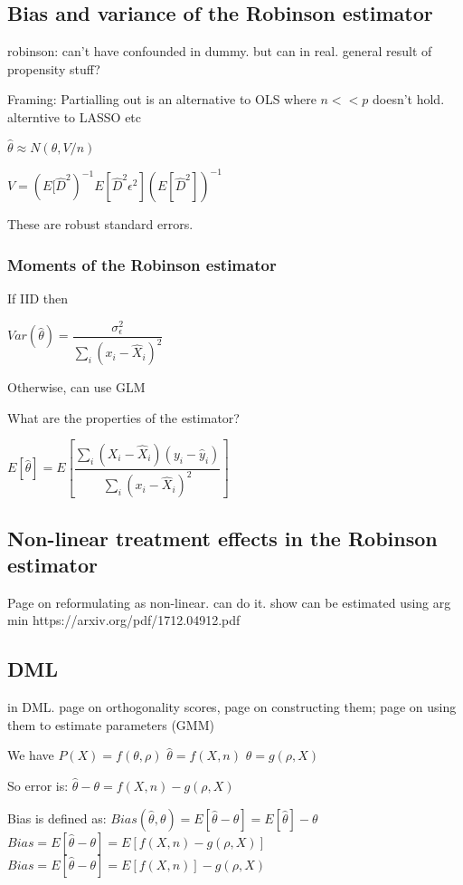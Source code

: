 
\subsection{Bias and variance of the Robinson estimator}

robinson: can't have confounded in dummy. but can in real. general result of propensity stuff?

Framing: Partialling out is an alternative to OLS where \(n<<p\) doesn't hold. alterntive to LASSO etc

\(\hat \theta \approx N(\theta, V/n)\)

\(V=(E[\hat D^2)^{-1}E[\hat D^2\epsilon^2 ](E[\hat D^2])^{-1}\)

These are robust standard errors. 

\subsubsection{Moments of the Robinson estimator}

If IID then

\(Var (\hat \theta) =\dfrac{\sigma^2_\epsilon }{\sum_i(x_i-\hat X_i)^2}\)

Otherwise, can use GLM

What are the properties of the estimator?

\(E[\hat \theta ]=E[\dfrac{\sum_i (X_i-\hat X_i)(y_i-\hat y_i)}{\sum_i(x_i-\hat X_i)^2}]\)


\subsection{Non-linear treatment effects in the Robinson estimator}

Page on reformulating as non-linear. can do it. show can be estimated using arg min
https://arxiv.org/pdf/1712.04912.pdf


\subsection{DML}

in DML. page on orthogonality scores, page on constructing them; page on using them to estimate parameters (GMM)

We have \(P(X)=f(\theta , \rho)\)
\(\hat \theta = f(X, n)\)
\(\theta = g(\rho , X)\)

So error is:
\(\hat \theta - \theta=f(X, n)-g(\rho , X)\)

Bias is defined as:
\(Bias(\hat \theta, \theta ) = E[\hat \theta - \theta]=E[\hat \theta ] - \theta \)
\(Bias = E[\hat \theta - \theta]=E[f(X, n)-g(\rho , X)]\)
\(Bias = E[\hat \theta - \theta]=E[f(X, n)]-g(\rho ,X)\)

